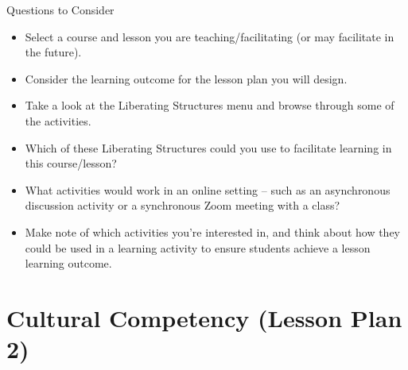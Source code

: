 \documentclass[
]{book}
\providecommand{\tightlist}{%
  \setlength{\itemsep}{0pt}\setlength{\parskip}{0pt}}
\begin{document}
\begin{reflect}
{Questions to Consider}

\begin{itemize}
\tightlist
\item
  Select a course and lesson you are teaching/facilitating (or may facilitate in the future).\\
\item
  Consider the learning outcome for the lesson plan you will design.\\
\item
  Take a look at the Liberating Structures menu and browse through some of the activities.\\
\item
  Which of these Liberating Structures could you use to facilitate learning in this course/lesson?\\
\item
  What activities would work in an online setting -- such as an asynchronous discussion activity or a synchronous Zoom meeting with a class?\\
\item
  Make note of which activities you're interested in, and think about how they could be used in a learning activity to ensure students achieve a lesson learning outcome.
\end{itemize}
\end{reflect}

\hypertarget{cultural-competency-lesson-plan-2}{%
\section{Cultural Competency (Lesson Plan 2)}\label{cultural-competency-lesson-plan-2}}
\end{document}
